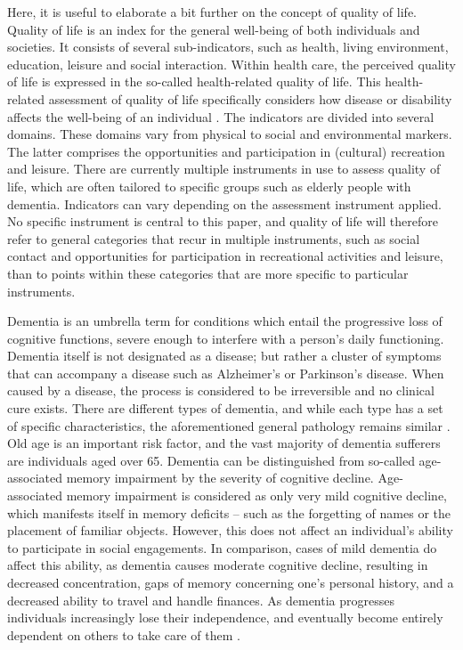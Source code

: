 Here, it is useful to elaborate a bit further on the concept 
of quality of life. Quality of life is an index for the general well-being of both 
individuals and societies. It consists of several sub-indicators, such as health, 
living environment, education, leisure and social interaction. Within health care, 
the perceived quality of life is expressed in the so-called health-related quality of life.
This health-related assessment of quality of life specifically considers how disease or 
disability affects the well-being of an individual \parencite{prevention_2011}.  
The indicators are divided into several domains. These domains vary from physical to 
social and environmental markers. The latter comprises the opportunities and participation 
in (cultural) recreation and leisure. There are currently multiple instruments in use 
to assess quality of life, which are often tailored to specific groups such as elderly 
people with dementia. Indicators can vary depending on the assessment instrument applied. 
No specific instrument is central to this paper, and quality of life will therefore refer 
to general categories that recur in multiple instruments, such as social contact 
and opportunities for participation in recreational activities and leisure, 
than to points within these categories that are more specific to particular instruments.
		
	
Dementia is an umbrella term 
for conditions which entail the progressive loss of cognitive functions, severe enough 
to interfere with a person’s daily functioning. Dementia itself is not designated as a 
disease; but rather a cluster of symptoms that can accompany a disease such as 
Alzheimer’s or Parkinson’s disease. When caused by a disease, the process is considered 
to be irreversible and no clinical cure exists.  There are different types of dementia, 
and while each type has a set of specific characteristics, the aforementioned general
pathology remains similar \parencite{Europe_2013}. Old age is an important risk factor, 
and the vast majority of dementia sufferers are individuals aged over 65. 
Dementia can be distinguished from so-called age-associated memory impairment by the severity 
of cognitive decline. Age-associated memory impairment is considered as only very mild 
cognitive decline, which manifests itself in memory deficits -- such as the forgetting of 
names or the placement of familiar objects. However, this does not affect an individual’s 
ability to participate in social engagements.  In comparison, cases of mild dementia do 
affect this ability, as dementia causes moderate cognitive decline, resulting in decreased 
concentration, gaps of memory concerning one’s personal history, and a decreased ability to 
travel and handle finances. As dementia progresses individuals increasingly lose their 
independence, and eventually become entirely dependent on others to take care of them \parencite{Reisberg_1983}.
	
